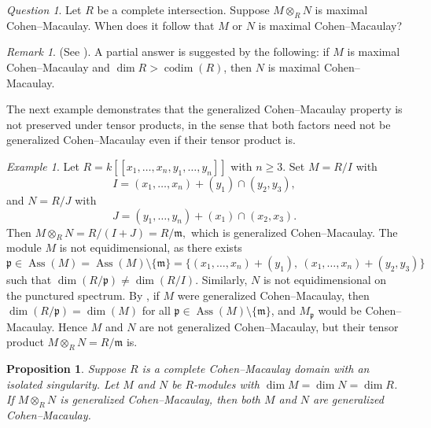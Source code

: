 \documentclass[11pt,a4paper]{amsart}
\numberwithin{equation}{section}
\newtheorem{proposition}[theorem]{Proposition}
\theoremstyle{definition}
\theoremstyle{remark}
\newtheorem{remark}[theorem]{Remark}
\newtheorem{example}[theorem]{Example}
\newtheorem{question}[theorem]{Question}\newtheorem{discussion}[theorem]{Discussion}
\begin{document}
	

	
	\begin{question}
		Let \(R\) be a complete intersection. Suppose \(M\otimes_R N\) is maximal Cohen--Macaulay. When does it follow that \(M\) or \(N\) is maximal Cohen--Macaulay?
	\end{question}
	
	\begin{remark}(See \cite[Theorem 1.4]{cel}).
		A partial answer is suggested by the following: if \(M\) is maximal Cohen--Macaulay and \(\dim R > \operatorname{codim}(R)\), then \(N\) is maximal Cohen--Macaulay.
	\end{remark}
	
The next example demonstrates that the generalized Cohen--Macaulay property is not preserved under tensor products, in the sense that both factors need not be generalized Cohen--Macaulay even if their tensor product is.

\begin{example}
	Let \(R = k[[x_1,\ldots,x_n, y_1,\ldots,y_n]]\) with \(n \ge 3\). Set \(M = R/I\) with
	\[
	I = (x_1,\ldots,x_n) + (y_1) \cap (y_2, y_3),
	\]
	and \(N = R/J\) with
	\[
	J = (y_1,\ldots,y_n) + (x_1) \cap (x_2, x_3).
	\]
	Then
	\(
	M \otimes_R N = R/(I + J) = R/\mathfrak{m},
	\)
	which is generalized Cohen--Macaulay.
The module \(M\) is not equidimensional, as there exists
	\[
	\mathfrak{p} \in \operatorname{Ass}(M) = \operatorname{Ass}(M) \setminus \{\mathfrak{m}\}
	= \{(x_1,\ldots,x_n) + (y_1),\ (x_1,\ldots,x_n) + (y_2, y_3)\}
	\]
	such that \(\dim(R/\mathfrak{p}) \neq \dim(R/I)\). Similarly, \(N\) is not equidimensional on the punctured spectrum.
By \cite[Example 9.5.7(1)]{BH}, if \(M\) were generalized Cohen--Macaulay, then \(\dim(R/\mathfrak{p}) = \dim(M)\) for all \(\mathfrak{p} \in \operatorname{Ass}(M) \setminus \{\mathfrak{m}\}\), and \(M_{\mathfrak{p}}\) would be Cohen--Macaulay. Hence \(M\) and \(N\) are not generalized Cohen--Macaulay, but their tensor product \(M \otimes_R N = R/\mathfrak{m}\) is.
\end{example}
	

	
\begin{proposition}
	Suppose \(R\) is a complete Cohen--Macaulay domain with an isolated singularity. Let \(M\) and \(N\) be \(R\)-modules with \(\dim M = \dim N = \dim R\). If \(M \otimes_R N\) is generalized Cohen--Macaulay, then both \(M\) and \(N\) are generalized Cohen--Macaulay.
\end{proposition}
\end{document}

